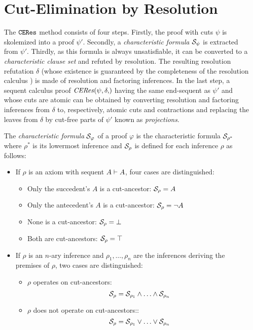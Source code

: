 \section{Cut-Elimination by Resolution}
\label{sec:CERes}


The $\texttt{CERes}$ method consists of four steps. Firstly, the proof with cuts $\psi$ is skolemized into a proof $\psi'$. Secondly, a \emph{characteristic formula} $\mathcal{S}_{\psi}$ is extracted from $\psi'$. Thirdly, as this formula is always unsatisfiable, it can be converted to a \emph{characteristic clause set} and refuted by resolution. The resulting resolution refutation $\delta$ (whose existence is guaranteed by the completeness of the resolution calculus \cite{Leitsch1997The-resolution-calculus}) is made of resolution and factoring inferences. In the last step, a sequent calculus proof $\CEResNF{\psi,\delta}$ having the same end-sequent as $\psi'$ and whose cuts are atomic can be obtained by converting resolution and factoring inferences from $\delta$ to, respectively, atomic cuts and contractions and replacing the leaves from $\delta$ by cut-free parts of $\psi'$ known as \emph{projections}.


\begin{definition}
\label{definition:PertinentStruct}
The \emph{characteristic formula} $\mathcal{S}_{\varphi}$ of a proof $\varphi$ is the characteristic formula $\mathcal{S}_{\rho^*}$ where $\rho^*$ is its lowermost inference and $\mathcal{S}_{\rho}$ is defined for each inference $\rho$ as follows:

\begin{itemize}
	\item If $\rho$ is an axiom with sequent $A \vdash A$, four cases are distinguished:
	\begin{itemize}	 	
	 	\item Only the succedent's $A$ is a cut-ancestor: $\mathcal{S}_{\rho} = A$
	 	\item Only the antecedent's $A$ is a cut-ancestor: $\mathcal{S}_{\rho} = \neg A $
	 	\item None is a cut-ancestor: $\mathcal{S}_{\rho} = \bot $
	 	\item Both are cut-ancestors: $\mathcal{S}_{\rho} = \top$
	\end{itemize}

	\item If $\rho$ is an $n$-ary inference and $\rho_1,\ldots,\rho_n$ are the inferences deriving the premises of $\rho$, two cases are distinguished:
	\begin{itemize}
		\item $\rho$ operates on cut-ancestors:
$$
\mathcal{S}_{\rho} = 
		\mathcal{S}_{\rho_1} \wedge \ldots \wedge \mathcal{S}_{\rho_n}
$$

	\item $\rho$ does not operate on cut-ancestors::
$$
\mathcal{S}_{\rho} = 
		\mathcal{S}_{\rho_1} \vee \ldots \vee \mathcal{S}_{\rho_n}
$$
	\end{itemize}
\end{itemize}
\end{definition}


